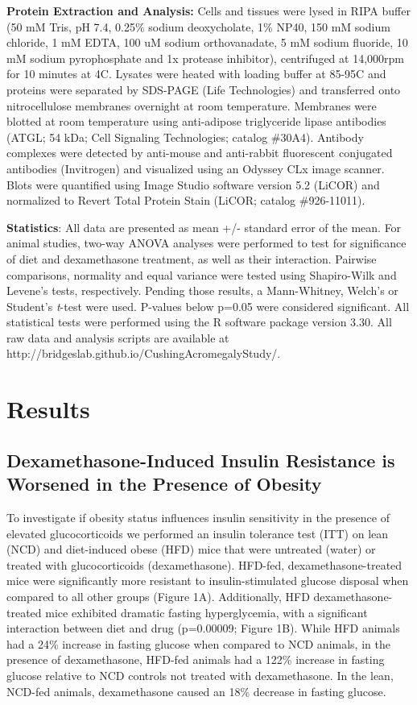 \documentclass[11pt]{article} %
\begin{document}
\textbf{Protein Extraction and Analysis:} Cells and tissues were lysed
in RIPA buffer (50 mM Tris, pH 7.4, 0.25\% sodium deoxycholate, 1\%
NP40, 150 mM sodium chloride, 1 mM EDTA, 100 uM sodium orthovanadate, 5
mM sodium fluoride, 10 mM sodium pyrophosphate and 1x protease
inhibitor), centrifuged at 14,000rpm for 10 minutes at 4\degree C. Lysates were
heated with loading buffer at 85-95\degree C and proteins were separated by
SDS-PAGE (Life Technologies) and transferred onto nitrocellulose
membranes overnight at room temperature. Membranes were blotted at room
temperature using anti-adipose triglyceride lipase antibodies (ATGL; 54
kDa; Cell Signaling Technologies; catalog \#30A4). Antibody complexes
were detected by anti-mouse and anti-rabbit fluorescent conjugated
antibodies (Invitrogen) and visualized using an Odyssey CLx image
scanner. Blots were quantified using Image Studio software version 5.2
(LiCOR) and normalized to Revert Total Protein Stain (LiCOR; catalog
\#926-11011).

\textbf{Statistics}: All data are presented as mean +/- standard error
of the mean. For animal studies, two-way ANOVA analyses were performed
to test for significance of diet and dexamethasone treatment, as well as
their interaction. Pairwise comparisons, normality and equal variance
were tested using Shapiro-Wilk and Levene's tests, respectively. Pending
those results, a Mann-Whitney, Welch's or Student's \emph{t}-test were
used. P-values below p=0.05 were considered significant. All statistical
tests were performed using the R software package version 3.30. All raw
data and analysis scripts are available at
http://bridgeslab.github.io/CushingAcromegalyStudy/.

\section*{Results}

\subsection*{Dexamethasone-Induced Insulin Resistance is Worsened in the
Presence of Obesity}
To investigate if obesity status influences insulin sensitivity in the
presence of elevated glucocorticoids we performed an insulin tolerance
test (ITT) on lean (NCD) and diet-induced obese (HFD) mice that were
untreated (water) or treated with glucocorticoids (dexamethasone).
HFD-fed, dexamethasone-treated mice were significantly more resistant to
insulin-stimulated glucose disposal when compared to all other groups
(Figure 1A). Additionally, HFD dexamethasone-treated mice exhibited
dramatic fasting hyperglycemia, with a significant interaction between
diet and drug (p=0.00009; Figure 1B). While HFD animals had a 24\%
increase in fasting glucose when compared to NCD animals, in the
presence of dexamethasone, HFD-fed animals had a 122\% increase in
fasting glucose relative to NCD controls not treated with dexamethasone.
In the lean, NCD-fed animals, dexamethasone caused an 18\% decrease in
fasting glucose.
\end{document}

